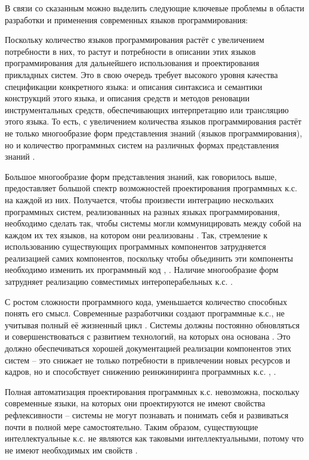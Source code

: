 В связи со сказанным можно выделить следующие ключевые проблемы в области разработки и применения современных языков программирования:
\begin{textitemize}
    \item Поскольку количество языков программирования растёт с увеличением потребности в них, то растут и потребности в описании этих языков программирования для дальнейшего использования и проектирования прикладных систем. Это в свою очередь требует высокого уровня качества спецификации конкретного языка: и описания синтаксиса и семантики конструкций этого языка, и описания средств и методов реновации инструментальных средств, обеспечивающих интерпретацию или трансляцию этого языка. То есть, с увеличением количества языков программирования растёт не только многообразие форм представления знаний (языков программирования), но и количество программных систем на различных формах представления знаний \cite{Zapata2010}.
    \item Большое многообразие форм представления знаний, как говорилось выше, предоставляет большой спектр возможностей проектирования программных к.с. на каждой из них. Получается, чтобы произвести интеграцию нескольких программных систем, реализованных на разных языках программирования, необходимо сделать так, чтобы системы могли коммуницировать между собой на каждом их тех языков, на котором они реализованы \cite{Golenkov2019a}. Так, стремление к использованию существующих программных компонентов затрудняется реализацией самих компонентов, поскольку чтобы объединить эти компоненты необходимо изменить их программный код \cite{Penta2020}, \cite{Scalabrino2016}. Наличие многообразие форм затрудняет реализацию совместимых интероперабельных к.с. \cite{Golenkov2012}.
    \item С ростом сложности программного кода, уменьшается количество способных понять его смысл. Современные разработчики создают программные к.с., не учитывая полный её жизненный цикл \cite{Brooks2021}. Системы должны постоянно обновляться и совершенствоваться с развитием технологий, на которых она основана \cite{Sellitto2022}. Это должно обеспечиваться хорошей документацией реализации компонентов этих систем -- это снижает не только потребности в привлечении новых ресурсов и кадров, но и способствует снижению реинжиниринга программных к.с. \cite{Penta2020}, \cite{Scalabrino2016}.
    \item Полная автоматизация проектирования программных к.с. невозможна, поскольку современные языки, на которых они проектируются не имеют свойства рефлексивности -- системы не могут познавать и понимать себя и развиваться почти в полной мере самостоятельно. Таким образом, существующие интеллектуальные к.с. не являются как таковыми интеллектуальными, потому что не имеют необходимых им свойств \cite{GolenkovPrinciples2021}.

\end{textitemize}
